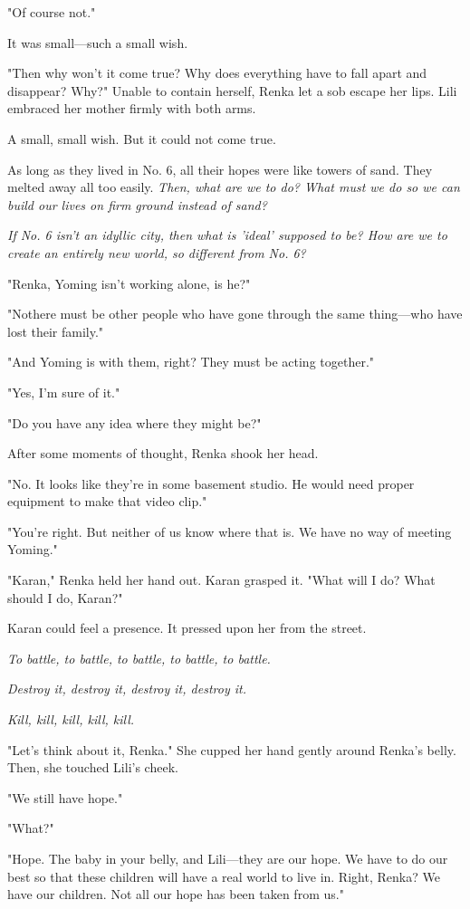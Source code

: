 "Of course not."

It was small---such a small wish.

"Then why won't it come true? Why does everything have to fall apart and
disappear? Why?" Unable to contain herself, Renka let a sob escape her
lips. Lili embraced her mother firmly with both arms.

A small, small wish. But it could not come true.

\mybreak

As long as they lived in No. 6, all their hopes were like towers of
sand. They melted away all too easily. \emph{Then, what are we to do? What
must we do so we can build our lives on firm ground instead of sand?}

\emph{If No. 6 isn't an idyllic city, then what is 'ideal' supposed to be? How
are we to create an entirely new world, so different from No. 6?}

"Renka, Yoming isn't working alone, is he?"

"No\el there must be other people who have gone through the same
thing---who have lost their family."

"And Yoming is with them, right? They must be acting together."

"Yes, I'm sure of it."

"Do you have any idea where they might be?"

After some moments of thought, Renka shook her head.

"No. It looks like they're in some basement studio. He would need proper
equipment to make that video clip."

"You're right. But neither of us know where that is. We have no way of
meeting Yoming."

"Karan," Renka held her hand out. Karan grasped it. "What will I do?
What should I do, Karan?"

Karan could feel a presence. It pressed upon her from the street.

\emph{To battle, to battle, to battle, to battle, to battle.}

\emph{Destroy it, destroy it, destroy it, destroy it.}

\emph{Kill, kill, kill, kill, kill.}

"Let's think about it, Renka." She cupped her hand gently around Renka's
belly. Then, she touched Lili's cheek.

"We still have hope."

"What?"

"Hope. The baby in your belly, and Lili---they are our hope. We have to do
our best so that these children will have a real world to live in.
Right, Renka? We have our children. Not all our hope has been taken from
us."

